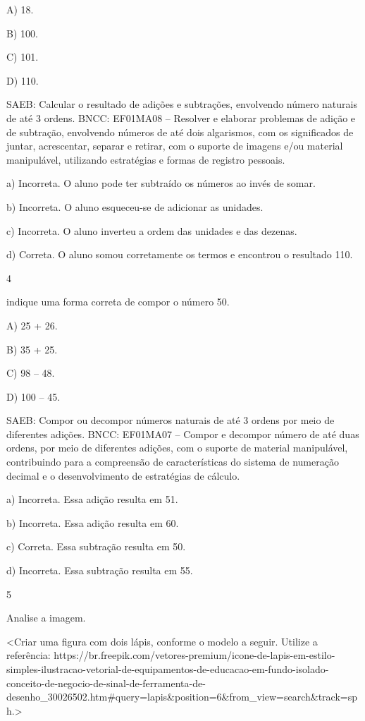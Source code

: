 A) 18.

B) 100.

C) 101.

D) 110.

SAEB: Calcular o resultado de adições e subtrações, envolvendo
número naturais de até 3 ordens.
BNCC: EF01MA08 -- Resolver e elaborar problemas de adição e de subtração,
envolvendo números de até dois algarismos, com os significados de
juntar, acrescentar, separar e retirar, com o suporte de imagens e/ou
material manipulável, utilizando estratégias e formas de registro
pessoais.

a) Incorreta. O aluno pode ter subtraído os números ao invés de
somar.

b) Incorreta. O aluno esqueceu-se de adicionar as unidades.

c) Incorreta. O aluno inverteu a ordem das unidades e das dezenas.

d) Correta. O aluno somou corretamente os termos e encontrou o resultado 110.

\num{4}

indique uma forma correta de compor o número 50.

A) 25 + 26.

B) 35 + 25.

C) 98 -- 48.

D) 100 -- 45.

SAEB: Compor ou decompor números naturais de até 3 ordens por
meio de diferentes adições.
BNCC: EF01MA07 -- Compor e decompor número de até duas ordens, por meio
de diferentes adições, com o suporte de material manipulável,
contribuindo para a compreensão de características do sistema de
numeração decimal e o desenvolvimento de estratégias de cálculo.

a) Incorreta. Essa adição resulta em 51.

b) Incorreta. Essa adição resulta em 60.

c) Correta. Essa subtração resulta em 50.

d) Incorreta. Essa subtração resulta em 55.

\num{5}

Analise a imagem.

\textless{}Criar uma figura com dois lápis, conforme o modelo a seguir.
Utilize a referência:
https://br.freepik.com/vetores-premium/icone-de-lapis-em-estilo-simples-ilustracao-vetorial-de-equipamentos-de-educacao-em-fundo-isolado-conceito-de-negocio-de-sinal-de-ferramenta-de-desenho\_30026502.htm\#query=lapis\&position=6\&from\_view=search\&track=sph.\textgreater{}

